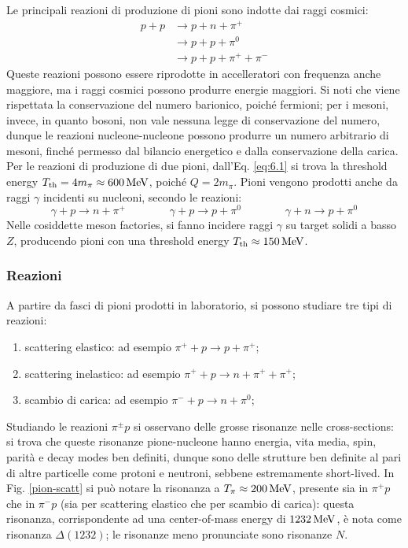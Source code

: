 Le principali reazioni di produzione di pioni sono indotte dai raggi cosmici:
\begin{equation*}
	\begin{split}
		p + p
		&\rightarrow p + n + \pi^+ \\
		&\rightarrow p + p + \pi^0 \\
		&\rightarrow p + p + \pi^+ + \pi^-
	\end{split}
\end{equation*}
Queste reazioni possono essere riprodotte in accelleratori con frequenza anche maggiore, ma i raggi cosmici possono produrre energie maggiori. Si noti che viene rispettata la conservazione del numero barionico, poiché fermioni; per i mesoni, invece, in quanto bosoni, non vale nessuna legge di conservazione del numero, dunque le reazioni nucleone-nucleone possono produrre un numero arbitrario di mesoni, finché permesso dal bilancio energetico e dalla conservazione della carica.\\
Per le reazioni di produzione di due pioni, dall'Eq. \ref{eq:6.1} si trova la threshold energy $ T_{\text{th}} = 4m_{\pi} \approx 600\,\mathrm{MeV} $, poiché $ Q = 2m_{\pi} $. Pioni vengono prodotti anche da raggi $ \gamma $ incidenti su nucleoni, secondo le reazioni:
\begin{equation*}
	\gamma + p \rightarrow n + \pi^+
	\qquad \qquad
	\gamma + p \rightarrow p + \pi^0
	\qquad \qquad
	\gamma + n \rightarrow p + \pi^0
\end{equation*}
Nelle cosiddette meson factories, si fanno incidere raggi $ \gamma $ su target solidi a basso $ Z $, producendo pioni con una threshold energy $ T_{\text{th}} \approx 150\,\mathrm{MeV} $.

\subsubsection{Reazioni}

A partire da fasci di pioni prodotti in laboratorio, si possono studiare tre tipi di reazioni:
\begin{enumerate}
	\item scattering elastico: ad esempio $ \pi^+ + p \rightarrow p + \pi^+ $;
	\item scattering inelastico: ad esempio $ \pi^+ + p \rightarrow n + \pi^+ + \pi^+ $;
	\item scambio di carica: ad esempio $ \pi^- + p \rightarrow n + \pi^0 $;
\end{enumerate}
Studiando le reazioni $ \pi^{\pm} p $ si osservano delle grosse risonanze nelle cross-sections: si trova che queste risonanze pione-nucleone hanno energia, vita media, spin, parità e decay modes ben definiti, dunque sono delle strutture ben definite al pari di altre particelle come protoni e neutroni, sebbene estremamente short-lived.
In Fig. \ref{pion-scatt} si può notare la risonanza a $ T_{\pi} \approx 200\,\mathrm{MeV} $, presente sia in $ \pi^+ p $ che in $ \pi^- p $ (sia per scattering elastico che per scambio di carica): questa risonanza, corrispondente ad una center-of-mass energy di $ 1232\,\mathrm{MeV} $, è nota come risonanza $ \Delta(1232) $; le risonanze meno pronunciate sono risonanze $ N $.

